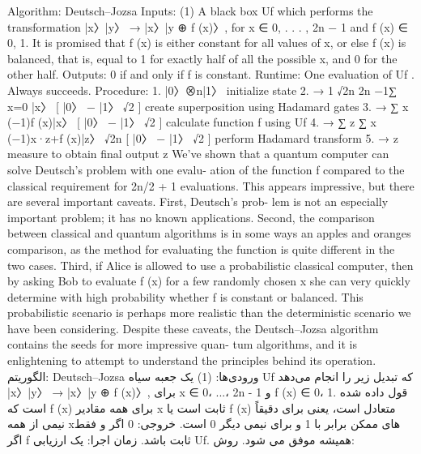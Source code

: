 \documentclass{book}
\begin{document}
	Algorithm: Deutsch–Jozsa
	Inputs: (1) A black box Uf which performs the transformation
	|x〉|y〉 → |x〉|y ⊕ f (x)〉, for x ∈ {0, . . . , 2n − 1} and f (x) ∈ {0, 1}. It is
	promised that f (x) is either constant for all values of x, or else f (x) is balanced,
	that is, equal to 1 for exactly half of all the possible x, and 0 for the other half.
	Outputs: 0 if and only if f is constant.
	Runtime: One evaluation of Uf . Always succeeds.
	Procedure:
	1. |0〉⊗n|1〉 initialize state
	2. → 1
	√2n
	2n −1∑
	x=0
	|x〉
	[ |0〉 − |1〉
	√2
	] create superposition using
	Hadamard gates
	3. → ∑
	x
	(−1)f (x)|x〉
	[ |0〉 − |1〉
	√2
	]
	calculate function f using Uf
	4. → ∑
	z
	∑
	x
	(−1)x·z+f (x)|z〉
	√2n
	[ |0〉 − |1〉
	√2
	]
	perform Hadamard transform
	5. → z measure to obtain final output z
	We’ve shown that a quantum computer can solve Deutsch’s problem with one evalu-
	ation of the function f compared to the classical requirement for 2n/2 + 1 evaluations.
	This appears impressive, but there are several important caveats. First, Deutsch’s prob-
	lem is not an especially important problem; it has no known applications. Second, the
	comparison between classical and quantum algorithms is in some ways an apples and
	oranges comparison, as the method for evaluating the function is quite different in the
	two cases. Third, if Alice is allowed to use a probabilistic classical computer, then by
	asking Bob to evaluate f (x) for a few randomly chosen x she can very quickly determine
	with high probability whether f is constant or balanced. This probabilistic scenario is
	perhaps more realistic than the deterministic scenario we have been considering. Despite
	these caveats, the Deutsch–Jozsa algorithm contains the seeds for more impressive quan-
	tum algorithms, and it is enlightening to attempt to understand the principles behind its
	operation.
	الگوریتم: Deutsch–Jozsa
	ورودی‌ها: (1) یک جعبه سیاه Uf که تبدیل زیر را انجام می‌دهد
	|x〉|y〉 → |x〉|y ⊕ f (x)〉, برای x ∈ {0، ...، 2n - 1} و f (x) ∈ {0، 1}. قول داده شده است که f (x) برای همه مقادیر x ثابت است یا f (x) متعادل است،
	یعنی برای دقیقاً نیمی از همه xهای ممکن برابر با 1 و برای نیمی دیگر 0 است.
	خروجی: 0 اگر و فقط اگر f ثابت باشد.
	زمان اجرا: یک ارزیابی Uf. همیشه موفق می شود.
	روش:
	
\end{document}
